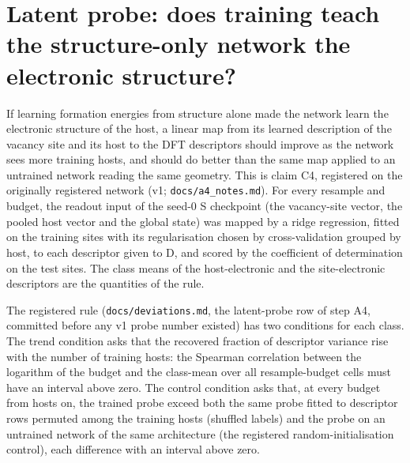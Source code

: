 \section{Latent probe: does training teach the structure-only network the electronic structure?}
\label{si:probe}

If learning formation energies from structure alone made the network learn the electronic structure of the host,
a linear map from its learned description of the vacancy site and its host to the DFT descriptors should improve as
the network sees more training hosts, and should do better than the same map applied to an untrained network
reading the same geometry. This is claim C4, registered on the originally registered network (v1;
\texttt{docs/a4\_notes.md}). For every resample and budget, the readout input of the seed-0 S checkpoint (the
vacancy-site vector, the pooled host vector and the global state) was mapped by a ridge regression, fitted on the
training sites with its regularisation chosen by cross-validation grouped by host, to each descriptor given to D,
and scored by the coefficient of determination \Rsq{} on the test sites. The class means of the host-electronic and
the site-electronic descriptors are the quantities of the rule.

The registered rule (\texttt{docs/deviations.md}, the latent-probe row of step A4, committed before any v1 probe
number existed) has two conditions for each class. The trend condition asks that the recovered fraction of
descriptor variance rise with the number of training hosts: the Spearman correlation between the logarithm of the
budget and the class-mean \Rsq{} over all \numProbeCFourVOneRuleHostTrendNCells{} resample-budget cells must have an
interval above zero. The control condition asks that, at every budget from \numCfgProbePassRuleBeatsControlsMinBudget{}
hosts on, the trained probe exceed both the same probe fitted to descriptor rows permuted among the training
hosts (shuffled labels) and the probe on an untrained network of the same architecture (the registered
random-initialisation control), each difference with an interval above zero.

